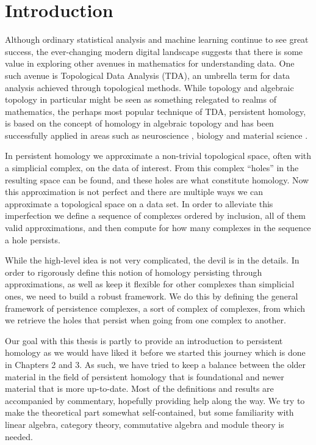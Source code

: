 \chapter{Introduction}
Although ordinary statistical analysis and machine learning continue to see great success, the ever-changing modern digital landscape suggests that there is some value in exploring other avenues in mathematics for understanding data. One such avenue is Topological Data Analysis (TDA), an umbrella term for data analysis achieved through topological methods. While topology and algebraic topology in particular might be seen as something relegated to realms of mathematics, the perhaps most popular technique of TDA, persistent homology, is based on the concept of homology in algebraic topology and has been successfully applied in areas such as neuroscience \cite{reimann}, biology \cite{plants} and material science \cite{moon2019}.

In persistent homology we approximate a non-trivial topological space, often with a simplicial complex, on the data of interest. From this complex ``holes'' in the resulting space can be found, and these holes are what constitute homology. Now this approximation is not perfect and there are multiple ways we can approximate a topological space on a data set. In order to alleviate this imperfection we define a sequence of complexes ordered by inclusion, all of them valid approximations, and then compute for how many complexes in the sequence a hole persists.

While the high-level idea is not very complicated, the devil is in the details. In order to rigorously define this notion of homology persisting through approximations, as well as keep it flexible for other complexes than simplicial ones, we need to build a robust framework. We do this by defining the general framework of  persistence complexes, a sort of complex of complexes, from which we retrieve the holes that persist when going from one complex to another.


Our goal with this thesis is partly to provide an introduction to persistent homology as we would have liked it before we started this journey which is done in Chapters 2 and 3. As such, we have tried to keep a balance between the older material in the field of persistent homology that is foundational and newer material that is more up-to-date. Most of the definitions and results are accompanied by commentary, hopefully providing help along the way. We try to make the theoretical part somewhat self-contained, but some familiarity with linear algebra, category theory, commutative algebra and module theory is needed.

